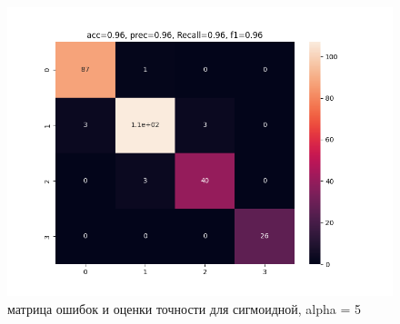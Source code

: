 \documentclass[12pt]{report}
\begin{document}
\begin{figure}[h!]
  \centering
  \includegraphics[width = \linewidth / 2]{matrix_errors_sigmoid_5.png}
  \caption{матрица ошибок и оценки точности для сигмоидной, alpha = 5}
  \label{fig:sigmoid_5_matrix}
\end{figure}
\end{document}
